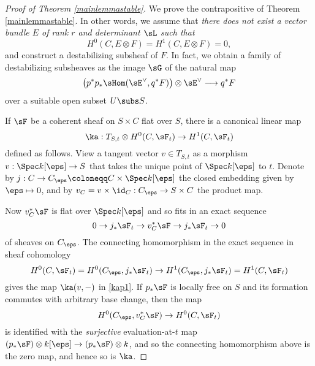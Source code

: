 \begin{proof}[Proof of Theorem \ref{mainlemmastable}]
We prove the contrapositive of Theorem \ref{mainlemmastable}. In other words, we assume that \emph{there does not exist a vector bundle $E$ of rank $r$ and determinant $\sL$ such that} 
\[ H^0(C, E \otimes F) = H^1(C, E \otimes F) = 0, \]
and construct a destabilizing subsheaf of $F$. In fact, we obtain a family of destabilizing subsheaves as the image $\sG$ of the natural map
\[ \left(p^* p_*\sHom(\sE^\vee, q^*F)\right) \otimes \sE^\vee  \longrightarrow q^*F \]
over a suitable open subset $U \subs S$.

If $\sF$ be a coherent sheaf on $S \times C$ flat over $S$, there is a canonical linear map
\begin{equation}\label{kap1}
    \ka: T_{S,t} \otimes H^0(C, \sF_t) \to H^1(C, \sF_t)
\end{equation}
defined as follows. View a tangent vector $v \in T_{S,t}$ as a morphism $v: \Spec k[\eps] \to S$ that takes the unique point of $\Spec k[\eps]$ to $t$. Denote by $j: C \to C_\eps \coloneqq C \times \Spec k[\eps]$ the closed embedding given by $\eps \mapsto 0$, and by $v_C = v \times \id_C: C_\eps \to S\times C$ the product map.
\begin{center}
\end{center}
Now $v_C^*\sF$ is flat over $\Spec k[\eps]$ and so fits in an exact sequence
\[ 0 \to j_* \sF_t \to v_C^*\sF \to j_* \sF_t \to 0 \]
of sheaves on $C_\eps$. The connecting homomorphism in the exact sequence in sheaf cohomology
\[ H^0(C, \sF_t) = H^0(C_\eps, j_*\sF_t) \to H^1(C_\eps, j_*\sF_t) = H^1(C, \sF_t) \]
gives the map $\ka(v, -)$ in \eqref{kap1}. If $p_*\sF$ is locally free on $S$ and its formation commutes with arbitrary base change, then the map
\[ H^0(C_\eps, v_C^*\sF) \to H^0(C, \sF_t) \]
is identified with the \emph{surjective} evaluation-at-$t$ map $(p_*\sF) \otimes k[\eps] \to (p_* \sF) \otimes k$, and so the connecting homomorphism above is the zero map, and hence so is $\ka$. 


\end{proof}
